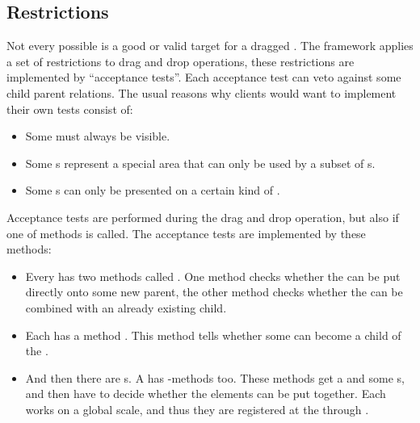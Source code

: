 
\subsection{Restrictions}
Not every possible  is a good or valid target for a dragged . The framework applies a set of restrictions to drag and drop operations, these restrictions are implemented by ``acceptance tests''. Each acceptance test can veto against some child parent relations. The usual reasons why clients would want to implement their own tests consist of:
\begin{itemize}
 \item Some  must always be visible.
 \item Some s represent a special area that can only be used by a subset of s.
 \item Some s can only be presented on a certain kind of .
\end{itemize}

Acceptance tests are performed during the drag and drop operation, but also if one of  methods is called. The acceptance tests are implemented by these methods:
\begin{itemize}
 \item Every  has two methods called . One method checks whether the  can be put directly onto some new parent, the other method checks whether the  can be combined with an already existing child.
 \item Each  has a method . This method tells whether some  can become a child of the .
 \item And then there are s. A  has -methods too. These methods get a  and some s, and then have to decide whether the elements can be put together. Each  works on a global scale, and thus they are registered at the  through .
\end{itemize}


